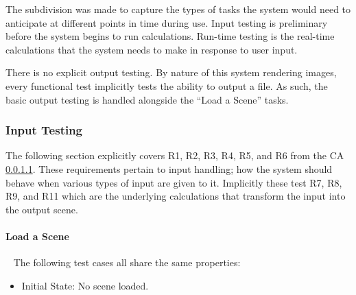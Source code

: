 \documentclass[12pt, titlepage]{article}
\begin{document}
The subdivision was made to capture the types of tasks the system would need to 
anticipate at different points in time during use. Input testing is preliminary 
before the system begins to run calculations. Run-time testing is the real-time 
calculations that the system needs to make in response to user input.

There is no explicit output testing. By nature of this system rendering images, 
every functional test implicitly tests the ability to output a file. As such, 
the basic output testing is handled alongside the ``Load a Scene'' tasks.

%

\subsubsection{Input Testing}
The following section explicitly covers R1, R2, R3, R4, R5, and R6 from the CA 
\ref{}. These requirements pertain to input handling; how the system should 
behave when various types of input are given to it. Implicitly these test R7, 
R8, R9, and R11 which are the underlying calculations that transform the input 
into the output scene.

		
\paragraph{Load a Scene}
~\newline
The following test cases all share the same properties:

\begin{itemize}
	\item[] Initial State: No scene loaded.
\end{itemize}
\end{document}
